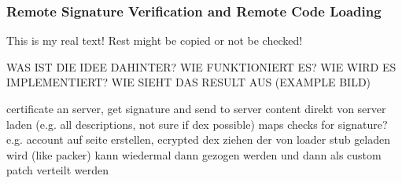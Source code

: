 \subsubsection{Remote Signature Verification and Remote Code Loading} \label{subsubsection:counter-tampering-signature-remote}
This is my real text! Rest might be copied or not be checked!



WAS IST DIE IDEE DAHINTER? WIE FUNKTIONIERT ES? WIE WIRD ES IMPLEMENTIERT? WIE SIEHT DAS RESULT AUS (EXAMPLE BILD)\newline

certificate an server, get signature and send to server\newline
content direkt von server laden (e.g. all descriptions, not sure if dex possible)\newline
maps checks for signature?\newline
e.g. account auf seite erstellen, ecrypted dex ziehen der von loader stub geladen wird (like packer)
kann wiedermal dann gezogen werden und dann als custom patch verteilt werden\newline
